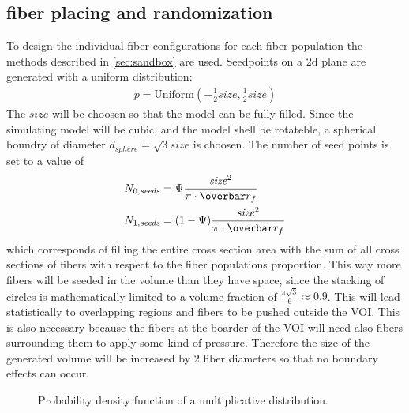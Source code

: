 \subsection{fiber placing and randomization}
% 
To design the individual fiber configurations for each fiber population the methods described in \cref{sec:sandbox} are used.
Seedpoints on a 2d plane are generated with a uniform distribution:
\begin{align}
p = \mathrm{Uniform}(-\frac{1}{2}\mathit{size},\frac{1}{2}\mathit{size})
\end{align}
The $\mathit{size}$ will be choosen so that the model can be fully filled.
Since the simulating model will be cubic, and the model shell be rotateble, a spherical boundry of diameter $d_{\mathit{sphere}}=\sqrt{3} \mathit{size}$ is choosen.
The number of seed points is set to a value of 
\begin{align}
N_{0,\mathit{seeds}} &= \Psi \frac{\mathit{size}^2}{\pi \cdot \fiberRadiusMean}\\
N_{1,\mathit{seeds}} &= (1-\Psi) \frac{\mathit{size}^2}{\pi \cdot \fiberRadiusMean}
\end{align}
which corresponds of filling the entire cross section area with the sum of all cross sections of fibers with respect to the fiber populations proportion.
This way more fibers will be seeded in the volume than they have space, since the stacking of circles is mathematically limited to a volume fraction of $\frac{\pi \sqrt{3}}{6} \approx 0.9$.
This will lead statistically to overlapping regions and fibers to be pushed outside the \ac{VOI}.
This is also necessary because the fibers at the boarder of the \ac{VOI} will need also fibers surrounding them to apply some kind of pressure.
Therefore the size of the generated volume will be increased by 2 fiber diameters so that no boundary effects can occur.
\par
% 
\begin{figure}[!t]
\centering
\tikzset{external/export=false}
\caption[]{ Probability density function of a multiplicative  distribution.}
\label{fig:logNormal}
\end{figure}
